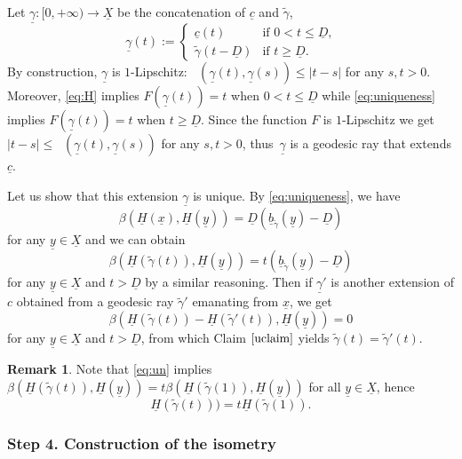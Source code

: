 \documentclass[JEP,XML,SOM,Unicode,published]{cedram}
\theoremstyle{plain}
\theoremstyle{definition}
\newtheorem{remark}[theorem]{Remark}
\newcommand{\dist}{\mathsf{d}}
\newcommand{\uX}{\underline{X}}
\newcommand{\ub}{\underline{b}}
\DeclareMathOperator{\udist}{\underline{\dist}}
\newcommand{\ux}{\underline{x}}
\newcommand{\uc}{\underline{c}}
\newcommand{\uD}{\underline{D}}
\newcommand{\uH}{\underline{H}}
\newcommand{\ugamma}{\underline{\gamma}}
\newcommand{\uy}{\underline{y}}
\begin{document}
Let $\ugamma:[0,+\infty)\to \uX$ be the concatenation of $\uc$ and $\tilde{\gamma}$, \ie
\[
\ugamma(t):=
\begin{cases}
\uc(t) & \text{if $0<t\le \uD$,}\\
\tilde{\gamma}(t-\uD) & \text{if $t\ge\uD$.}
\end{cases}
\]
By construction, $\ugamma$ is $1$-Lipschitz: $\udist(\ugamma(t),\ugamma(s))\le |t-s|$ for any $s,t>0$. Moreover, \eqref{eq:H} implies $F(\ugamma(t))=t$ when $0<t\le \uD$ while \eqref{eq:uniqueness} implies $F(\ugamma(t))=t$ when $t\ge \uD$. Since the function $F$ is $1$-Lipschitz we get $|t-s| \le \udist(\ugamma(t),\ugamma(s))$ for any $s,t>0$, thus~$\ugamma$ is a geodesic ray that extends $\uc$.

Let us show that this extension $\ugamma$ is unique. By \eqref{eq:uniqueness}, we have
\begin{equation}\label{eq:un}
\beta(\uH(\ux),\uH(\uy)) = \uD(\ub_{\tilde{\gamma}}(\uy)-\uD)
\end{equation}
for any $\uy \in \uX$ and we can obtain
\begin{equation}
\beta(\uH(\tilde{\gamma}(t)),\uH(\uy)) = t(\ub_{\tilde{\gamma}}(\uy)-\uD)
\end{equation}
for any $\uy \in \uX$ and $t>\uD$ by a similar reasoning. Then if $\ugamma'$ is another extension of $c$ obtained from a geodesic ray $\tilde{\gamma}'$ emanating from $\ux$, we get
\[
\beta(\uH(\tilde{\gamma}(t))-\uH(\tilde{\gamma}'(t)),\uH(\uy)) =0
\]
for any $\uy \in \uX$ and $t>\uD$, from which Claim $\ref{uclaim}$ yields $\tilde{\gamma}(t)=\tilde{\gamma}'(t)$.

\begin{remark}
Note that \eqref{eq:un} implies $\beta(\uH(\tilde{\gamma}(t)),\uH(\uy)) = t\beta(\uH(\tilde{\gamma}(1)),\uH(\uy))$ for all $\uy \in \uX$, hence
\begin{equation}\label{eq:conicalstructure}
\uH(\tilde{\gamma}(t)))= t\uH(\tilde{\gamma}(1)).
\end{equation}
\end{remark}

\subsubsection*{Step 4. Construction of the isometry}
\end{document}

